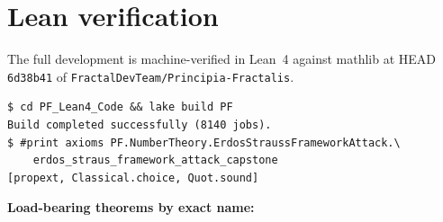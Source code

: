 \documentclass[11pt,a4paper]{article}
\theoremstyle{plain}
\theoremstyle{definition}
\begin{document}
\section{Lean verification}
\label{sec:lean}

The full development is machine-verified in Lean~4 against mathlib at
HEAD \texttt{6d38b41} of \texttt{FractalDevTeam/Principia-Fractalis}.

\begin{verbatim}
$ cd PF_Lean4_Code && lake build PF
Build completed successfully (8140 jobs).
$ #print axioms PF.NumberTheory.ErdosStraussFrameworkAttack.\
    erdos_straus_framework_attack_capstone
[propext, Classical.choice, Quot.sound]
\end{verbatim}

\noindent\textbf{Load-bearing theorems by exact name:}
\end{document}
